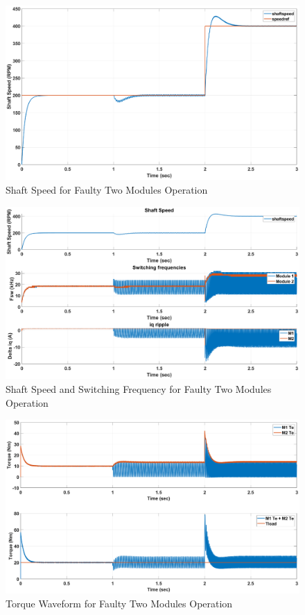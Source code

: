 \documentclass{article}
\begin{document}
\begin{figure}[h!]
\centering
\includegraphics[scale=0.35]{SimulationResults/two_modules/faulty/speed.eps}
\caption{Shaft Speed for Faulty Two Modules Operation}
\label{fig:ShaftSpeedTwoModulesFaulty}
\end{figure}

\begin{figure}[h!]
\centering
\includegraphics[scale=0.35]{SimulationResults/two_modules/faulty/speed_fsw_iqripple.eps}
\caption{Shaft Speed and Switching Frequency for Faulty Two Modules Operation}
\label{fig:ShaftSpeedFswIqRippleTwoModulesFaulty}
\end{figure}

\begin{figure}[h!]
\centering
\includegraphics[scale=0.35]{SimulationResults/two_modules/faulty/tref_tload.eps}
\caption{Torque Waveform for Faulty Two Modules Operation}
\label{fig:TorqueTwoModulesFaulty}
\end{figure}
\end{document}
